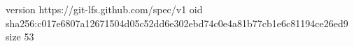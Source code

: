 version https://git-lfs.github.com/spec/v1
oid sha256:c017e6807a12671504d05c52dd6e302ebd74c0e4a81b77cb1e6c81194ce26ed9
size 53
